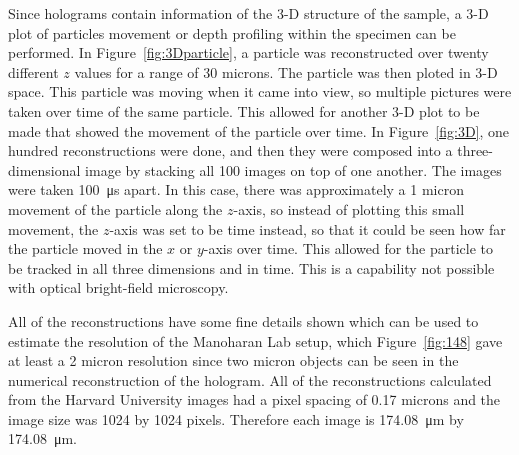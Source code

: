Since holograms contain information of the 3-D structure of the sample, a 3-D
plot of particles movement or depth profiling within the specimen can be
performed. In Figure~\ref{fig:3Dparticle}, a particle was reconstructed over
twenty different $z$ values for a range of 30 microns. The particle was then ploted in 3-D
space. This particle was moving when it came into view, so multiple pictures
were taken over time of the same particle. This allowed for another 3-D plot to
be made that showed the movement of the particle over time.
In Figure~\ref{fig:3D}, one hundred reconstructions were done, and then they
were composed into a three-dimensional image by stacking all 100 images on top
of one another. The images were taken \SI{100}{\micro\second} apart. 
In this case, there was approximately a 1 micron movement 
of the particle along the $z$-axis, so instead of plotting this small movement,
the $z$-axis was set to be time instead, so that it could be seen how far the
particle moved in the $x$ or $y$-axis over time.
This allowed for the
particle to be tracked in all three dimensions and in time. This is a
capability not possible with optical bright-field microscopy.

All of the reconstructions have some fine details shown which can be used to
estimate the resolution of the Manoharan Lab setup, which Figure~\ref{fig:148} gave at
least a 2 micron resolution since two micron objects can be seen in the
numerical reconstruction of the hologram.
All of the
reconstructions calculated from the Harvard University images had a pixel
spacing of 0.17 microns and the image size was 1024 by 1024 pixels.
Therefore each image is \SI{174.08}{\micro\meter} by \SI{174.08}{\micro\meter}.


%
%
%
%
%
